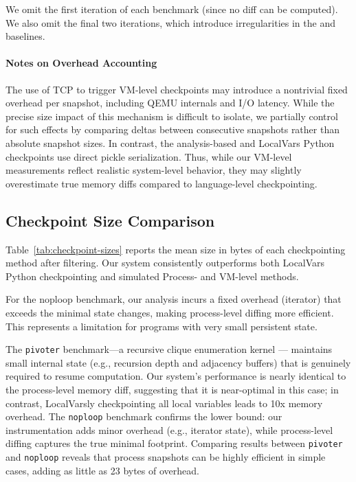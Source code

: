We omit the first iteration of each benchmark (since no diff can be computed). We also omit the final two iterations, which introduce irregularities in the \PROCDIFF and \VMDIFF baselines.

\paragraph{Notes on Overhead Accounting}
The use of TCP to trigger VM-level checkpoints may introduce a nontrivial fixed overhead per snapshot, including QEMU internals and I/O latency. While the precise size impact of this mechanism is difficult to isolate, we partially control for such effects by comparing deltas between consecutive snapshots rather than absolute snapshot sizes. In contrast, the analysis-based and LocalVars Python checkpoints use direct pickle serialization. Thus, while our VM-level measurements reflect realistic system-level behavior, they may slightly overestimate true memory diffs compared to language-level checkpointing.

\subsection{Checkpoint Size Comparison}

Table~\ref{tab:checkpoint-sizes} reports the mean size in bytes of each checkpointing method after filtering. Our system consistently outperforms both LocalVars Python checkpointing and simulated Process- and VM-level methods.

For the noploop benchmark, our analysis incurs a fixed overhead (iterator) that exceeds 
the minimal state changes, making process-level diffing more efficient. This 
represents a limitation for programs with very small persistent state.

The \texttt{pivoter} benchmark---a recursive clique enumeration kernel --- maintains small internal state (e.g., recursion depth and adjacency buffers) that is genuinely required to resume computation. Our system’s performance is nearly identical to the process-level memory diff, suggesting that it is near-optimal in this case; in contrast, LocalVarsly checkpointing all local variables leads to 10x memory overhead. The \texttt{noploop} benchmark confirms the lower bound: our instrumentation adds minor overhead (e.g., iterator state), while process-level diffing captures the true minimal footprint. Comparing \texttt{\PROCDIFF} results between \texttt{pivoter} and \texttt{noploop} reveals that process snapshots can be highly efficient in simple cases, adding as little as 23 bytes of overhead.

